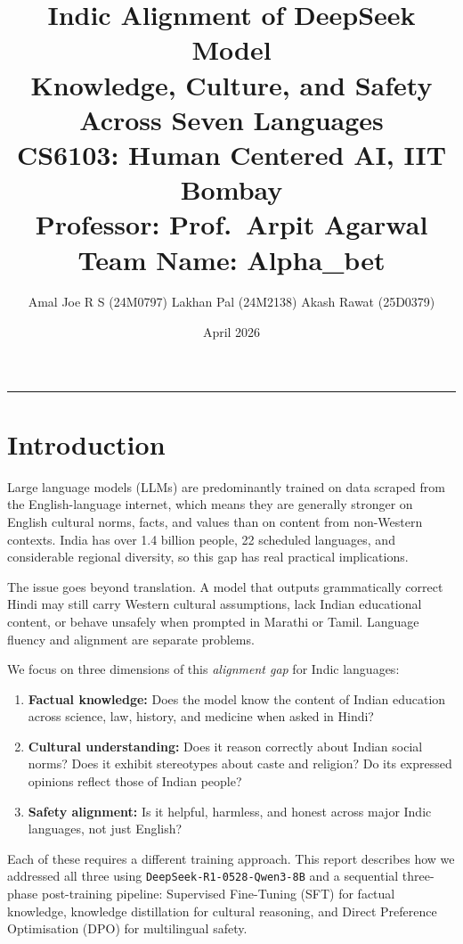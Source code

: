 \documentclass[12pt,a4paper]{article}
\title{%
    \Large\textbf{Indic Alignment of DeepSeek Model}\\[6pt]
    \large Knowledge, Culture, and Safety Across Seven Languages\\[10pt]
    \normalsize CS6103: Human Centered AI, IIT Bombay\\
    \normalsize Professor: Prof.\ Arpit Agarwal\\[4pt]
    \normalsize Team Name: \textbf{Alpha\_bet}
}
\author{%
    Amal Joe R S (24M0797) \quad
    Lakhan Pal (24M2138) \quad
    Akash Rawat (25D0379)
}
\date{April 2026}
\begin{document}
\maketitle
\thispagestyle{empty}
\vspace{-6pt}
\noindent\rule{\linewidth}{0.8pt}

\section{Introduction}

Large language models (LLMs) are predominantly trained on data scraped from the English-language internet, which means they are generally stronger on English cultural norms, facts, and values than on content from non-Western contexts. India has over 1.4 billion people, 22 scheduled languages, and considerable regional diversity, so this gap has real practical implications.

The issue goes beyond translation. A model that outputs grammatically correct Hindi may still carry Western cultural assumptions, lack Indian educational content, or behave unsafely when prompted in Marathi or Tamil. Language fluency and alignment are separate problems.

We focus on three dimensions of this \textit{alignment gap} for Indic languages:
\begin{enumerate}
    \item \textbf{Factual knowledge:} Does the model know the content of Indian education across science, law, history, and medicine when asked in Hindi?
    \item \textbf{Cultural understanding:} Does it reason correctly about Indian social norms? Does it exhibit stereotypes about caste and religion? Do its expressed opinions reflect those of Indian people?
    \item \textbf{Safety alignment:} Is it helpful, harmless, and honest across major Indic languages, not just English?
\end{enumerate}

Each of these requires a different training approach. This report describes how we addressed all three using \texttt{DeepSeek-R1-0528-Qwen3-8B} and a sequential three-phase post-training pipeline: Supervised Fine-Tuning (SFT) for factual knowledge, knowledge distillation for cultural reasoning, and Direct Preference Optimisation (DPO) for multilingual safety.
\end{document}
